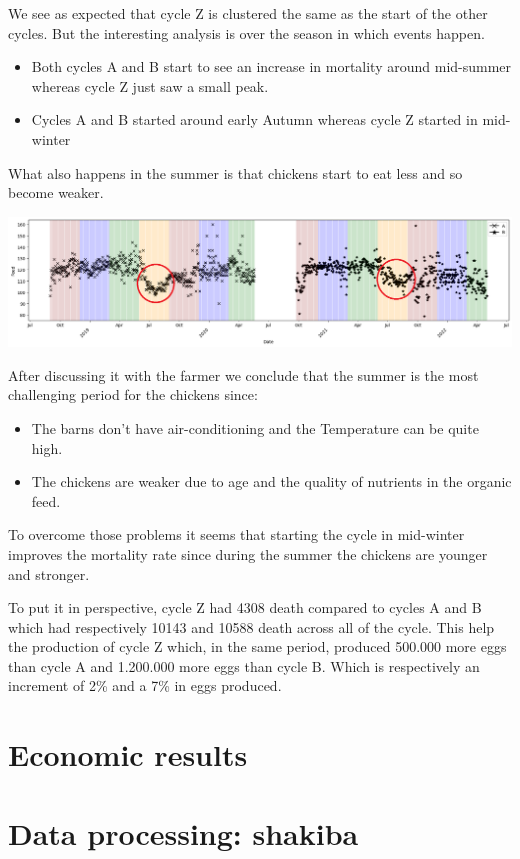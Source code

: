 \documentclass[11pt]{article}
\begin{document}
We see as expected that cycle Z is clustered the same as the start of the other cycles. But the interesting analysis is over the season in which events happen.

\begin{itemize}
    \item Both cycles A and B start to see an increase in mortality around mid-summer whereas cycle Z just saw a small peak.
    \item Cycles A and B started around early Autumn whereas cycle Z started in mid-winter
\end{itemize}

What also happens in the summer is that chickens start to eat less and so become weaker.

\includegraphics[width=\linewidth]{../Results/Comparison_Z_AB/feed_plot.png}

After discussing it with the farmer we conclude that the summer is the most challenging period for the chickens since:
\begin{itemize}
    \item The barns don't have air-conditioning and the Temperature can be quite high.
    \item The chickens are weaker due to age and the quality of nutrients in the organic feed.
\end{itemize}

To overcome those problems it seems that starting the cycle in mid-winter improves the mortality rate since during the summer the chickens are younger and stronger.

To put it in perspective, cycle Z had 4308 death compared to cycles A and B which had respectively 10143 and 10588 death across all of the cycle.
This help the production of cycle Z which, in the same period, produced 500.000 more eggs than cycle A and 1.200.000 more eggs than cycle B. Which is respectively an increment of 2\% and a 7\% in eggs produced.

\section{Economic results}

\section{Data processing: shakiba}
\end{document}
